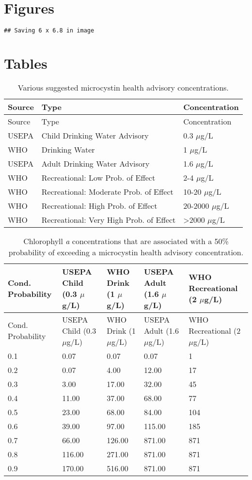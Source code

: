 \documentclass[11pt,]{article}
\begin{document}
\newpage

\section{Figures}\label{figures}

\begin{verbatim}
## Saving 6 x 6.8 in image
\end{verbatim}

\newpage

\newpage

\section{Tables}\label{tables}

\begin{longtable}[c]{@{}lll@{}}
\caption{Various suggested microcystin health advisory concentrations.
\label{tab:microcystin_levels}}\tabularnewline
\toprule
Source & Type & Concentration\tabularnewline
\midrule
\endfirsthead
\toprule
Source & Type & Concentration\tabularnewline
\midrule
\endhead
USEPA & Child Drinking Water Advisory & 0.3 \(\mu\)g/L\tabularnewline
WHO & Drinking Water & 1 \(\mu\)g/L\tabularnewline
USEPA & Adult Drinking Water Advisory & 1.6 \(\mu\)g/L\tabularnewline
WHO & Recreational: Low Prob. of Effect & 2-4 \(\mu\)g/L\tabularnewline
WHO & Recreational: Moderate Prob. of Effect & 10-20
\(\mu\)g/L\tabularnewline
WHO & Recreational: High Prob. of Effect & 20-2000
\(\mu\)g/L\tabularnewline
WHO & Recreational: Very High Prob. of Effect & \textgreater{}2000
\(\mu\)g/L\tabularnewline
\bottomrule
\end{longtable}

\newpage

\begin{longtable}[c]{@{}lllll@{}}
\caption{Chlorophyll \textit{a} concentrations that are associated with
a 50\% probability of exceeding a microcystin health advisory
concentration. \label{tab:mc_chla_table}}\tabularnewline
\toprule
Cond. Probability & USEPA Child (0.3 \(\mu\)g/L) & WHO Drink (1
\(\mu\)g/L) & USEPA Adult (1.6 \(\mu\)g/L) & WHO Recreational (2
\(\mu\)g/L)\tabularnewline
\midrule
\endfirsthead
\toprule
Cond. Probability & USEPA Child (0.3 \(\mu\)g/L) & WHO Drink (1
\(\mu\)g/L) & USEPA Adult (1.6 \(\mu\)g/L) & WHO Recreational (2
\(\mu\)g/L)\tabularnewline
\midrule
\endhead
0.1 & 0.07 & 0.07 & 0.07 & 1\tabularnewline
0.2 & 0.07 & 4.00 & 12.00 & 17\tabularnewline
0.3 & 3.00 & 17.00 & 32.00 & 45\tabularnewline
0.4 & 11.00 & 37.00 & 68.00 & 77\tabularnewline
0.5 & 23.00 & 68.00 & 84.00 & 104\tabularnewline
0.6 & 39.00 & 97.00 & 115.00 & 185\tabularnewline
0.7 & 66.00 & 126.00 & 871.00 & 871\tabularnewline
0.8 & 116.00 & 271.00 & 871.00 & 871\tabularnewline
0.9 & 170.00 & 516.00 & 871.00 & 871\tabularnewline
\bottomrule
\end{longtable}
\end{document}

